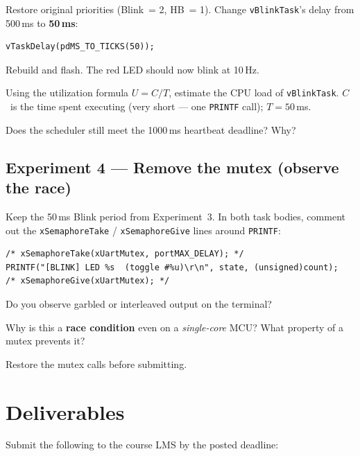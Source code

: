 \documentclass[11pt, a4paper]{article}
\newcommand{\api}[1]{\texttt{\small #1}}
\begin{document}
Restore original priorities (Blink~= 2, HB~= 1).
Change \texttt{vBlinkTask}'s delay from 500\,ms to \textbf{50\,ms}:

\begin{lstlisting}[style=cstyle]
vTaskDelay(pdMS_TO_TICKS(50));
\end{lstlisting}

Rebuild and flash.  The red LED should now blink at 10\,Hz.

\begin{questionbox}
  Using the utilization formula $U = C/T$, estimate the CPU load of
  \texttt{vBlinkTask}. $C$~is the time spent executing (very short --- one
  \api{PRINTF} call); $T = 50$\,ms.

  Does the scheduler still meet the 1000\,ms heartbeat deadline?  Why?
\end{questionbox}

\subsection{Experiment 4 --- Remove the mutex (observe the race)}

Keep the 50\,ms Blink period from Experiment~3.  In both task bodies, comment out
the \api{xSemaphoreTake} / \api{xSemaphoreGive} lines around \api{PRINTF}:

\begin{lstlisting}[style=cstyle]
/* xSemaphoreTake(xUartMutex, portMAX_DELAY); */
PRINTF("[BLINK] LED %s  (toggle #%u)\r\n", state, (unsigned)count);
/* xSemaphoreGive(xUartMutex); */
\end{lstlisting}

\begin{questionbox}
  Do you observe garbled or interleaved output on the terminal?

  Why is this a \textbf{race condition} even on a \emph{single-core} MCU?
  What property of a mutex prevents it?
\end{questionbox}

\begin{warnbox}
  Restore the mutex calls before submitting.
\end{warnbox}

\section{Deliverables}

Submit the following to the course LMS by the posted deadline:
\end{document}
